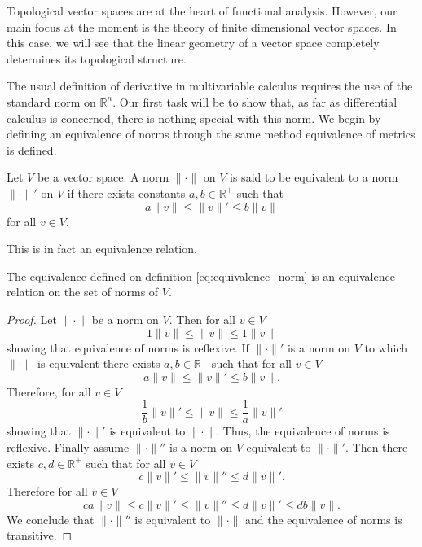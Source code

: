 Topological vector spaces are at the heart of functional analysis. However, our main focus at the moment is the theory of finite dimensional vector spaces. In this case, we will see that the linear geometry of a vector space completely determines its topological structure. 

The usual definition of derivative in multivariable calculus requires the use of the standard norm on $\mathbb{R}^n$. Our first task will be to show that, as far as differential calculus is concerned, there is nothing special with this norm. We begin by defining an equivalence of norms through the same method equivalence of metrics is defined.

\begin{definition}\label{eq:equivalence_norm}
	Let $V$ be a vector space. A norm $\|\cdot\|$ on $V$ is said to be equivalent to a norm $\|\cdot\|'$ on $V$ if there exists constants $a,b\in\mathbb{R}^+$ such that
	\begin{equation}
		a\|v\|\leq\|v\|'\leq b\|v\|
	\end{equation}
for all $v\in V$.
\end{definition}

This is in fact an equivalence relation. 

\begin{theorem}
	The equivalence defined on definition \ref{eq:equivalence_norm} is an equivalence relation on the set of norms of $V$.
\end{theorem}

\begin{proof}
	Let $\|\cdot\|$ be a norm on $V$. Then for all $v\in V$
	\begin{equation}
		1\|v\|\leq\|v\|\leq1\|v\|
	\end{equation}
showing that equivalence of norms is reflexive. If $\|\cdot\|'$ is a norm on $V$ to which $\|\cdot\|$ is equivalent there exists $a,b\in\mathbb{R}^+$ such that for all $v\in V$
	\begin{equation}
		a\|v\|\leq\|v\|'\leq b\|v\|.
	\end{equation}
Therefore, for all $v\in V$
	\begin{equation}
		\frac{1}{b}\|v\|'\leq\|v\|\leq\frac{1}{a}\|v\|'
	\end{equation}
showing that $\|\cdot\|'$ is equivalent to $\|\cdot\|$. Thus, the equivalence of norms is reflexive. Finally assume $\|\cdot\|''$ is a norm on $V$ equivalent to $\|\cdot\|'$. Then there exists $c,d\in\mathbb{R}^+$ such that for all $v\in V$
	\begin{equation}
		c\|v\|'\leq\|v\|''\leq d\|v\|'.
	\end{equation}
Therefore for all $v\in V$
	\begin{equation}
		ca\|v\|\leq c\|v\|'\leq\|v\|''\leq d\|v\|'\leq db\|v\|.
	\end{equation}
We conclude that $\|\cdot\|''$ is equivalent to $\|\cdot\|$ and the equivalence of norms is transitive.
\end{proof}

